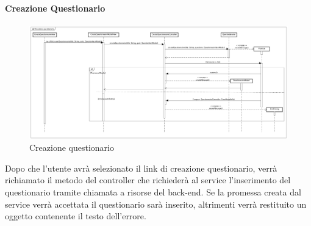 \paragraph{Creazione Questionario}

\label{Creazione questionario}

\begin{figure}[ht]
	\centering
	\includegraphics[scale=0.25,keepaspectratio]{UML/DiagrammiDiSequenza/Front-end/QuestionnaireCreation.png}
	\caption{Creazione questionario}
\end{figure} \FloatBarrier

Dopo che l'utente avrà selezionato il link di creazione questionario, verrà richiamato il metodo del controller che richiederà al service l'inserimento del questionario tramite chiamata a risorse del back-end. Se la promessa creata dal service verrà accettata il questionario sarà inserito, altrimenti verrà restituito un oggetto contenente il testo dell'errore. 